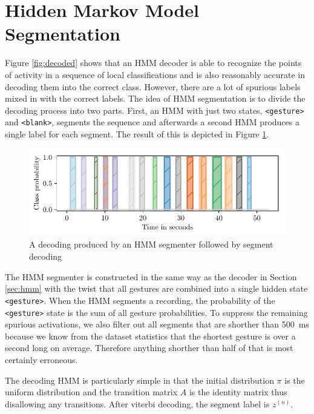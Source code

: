 \section{Hidden Markov Model Segmentation}
\label{sec:hmm-segmentation}

Figure \ref{fig:decoded} shows that an HMM decoder is able to recognize the
points of activity in a sequence of local classifications and is also reasonably
accurate in decoding them into the correct class. However, there are a lot of
spurious labels mixed in with the correct labels. The idea of HMM segmentation
is to divide the decoding process into two parts. First, an HMM with just two
states, \texttt{<gesture>} and \texttt{<blank>}, segments the sequence and
afterwards a second HMM produces a single label for each segment. The result of
this is depicted in Figure \ref{fig:segmented}.

\begin{figure}
  \centering
  \includegraphics{figures/methods/segmented}
  \caption{A decoding produced by an HMM segmenter followed by segment decoding}
  \label{fig:segmented}
\end{figure}

The HMM segmenter is constructed in the same way as the decoder in Section
\ref{sec:hmm} with the twist that all gestures are combined into a single hidden
state \texttt{<gesture>}. When the HMM segments a recording, the probability of
the \texttt{<gesture>} state is the sum of all gesture probabilities. To suppress
the remaining spurious activations, we also filter out all segments that are
shorther than \SI{500}{\milli\second} because we know from the dataset
statistics that the shortest gesture is over a second long on average. Therefore
anything shorther than half of that is most certainly erroneous.

The decoding HMM is particularly simple in that the initial distribution $\pi$
is the uniform distribution and the transition matrix $A$ is the identity matrix
thus disallowing any transitions. After viterbi decoding, the segment label is
$z^{(n)}$.

